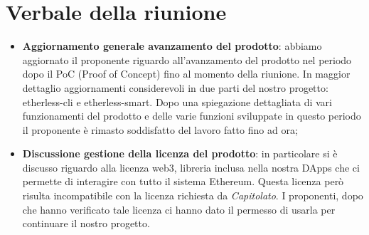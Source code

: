 \section{Verbale della riunione}
	\begin{itemize}
		\item \textbf{Aggiornamento generale avanzamento del prodotto}: 
		abbiamo aggiornato il proponente riguardo all'avanzamento del prodotto nel periodo dopo il PoC (Proof of Concept) fino al momento della riunione. In maggior dettaglio aggiornamenti considerevoli in due parti del nostro progetto: etherless-cli e etherless-smart. Dopo una spiegazione dettagliata di vari funzionamenti del prodotto e delle varie funzioni sviluppate in questo periodo il proponente è rimasto soddisfatto del lavoro fatto fino ad ora;
		
		\item \textbf{Discussione gestione della licenza del prodotto}:
	 	in particolare si è discusso riguardo alla licenza web3, libreria inclusa nella nostra DApps che ci permette di interagire con tutto il sistema Ethereum. Questa licenza però risulta incompatibile con la licenza richiesta da \textit{Capitolato}. I proponenti, dopo che hanno verificato tale licenza ci hanno dato il permesso di usarla per continuare il nostro progetto.
	 	
	\end{itemize}
